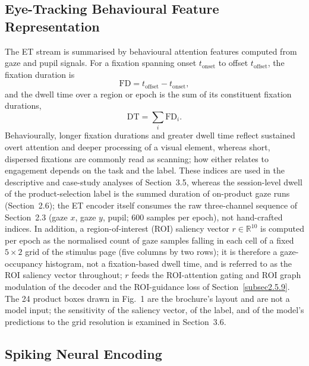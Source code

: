 \documentclass[pdflatex,sn-basic,Numbered]{sn-jnl}
\begin{document}
\subsection{Eye-Tracking Behavioural Feature Representation}\label{subsec2.5.3}

The ET stream is summarised by behavioural attention features computed from gaze and pupil signals. For a fixation spanning onset $t_{\text{onset}}$ to offset $t_{\text{offset}}$, the fixation duration is
\begin{equation}
\mathrm{FD} = t_{\text{offset}} - t_{\text{onset}}, \label{eq4}
\end{equation}
and the dwell time over a region or epoch is the sum of its constituent fixation durations,
\begin{equation}
\mathrm{DT} = \sum_i \mathrm{FD}_i. \label{eq5}
\end{equation}
Behaviourally, longer fixation durations and greater dwell time reflect sustained overt attention and deeper processing of a visual element, whereas short, dispersed fixations are commonly read as scanning; how either relates to engagement depends on the task and the label. These indices are used in the descriptive and case-study analyses of Section~3.5, whereas the session-level dwell of the product-selection label is the summed duration of on-product gaze runs (Section~2.6); the ET encoder itself consumes the raw three-channel sequence of Section~2.3 (gaze $x$, gaze $y$, pupil; 600 samples per epoch), not hand-crafted indices. In addition, a region-of-interest (ROI) saliency vector $r\in\mathbb{R}^{10}$ is computed per epoch as the normalised count of gaze samples falling in each cell of a fixed $5\times2$ grid of the stimulus page (five columns by two rows); it is therefore a gaze-occupancy histogram, not a fixation-based dwell time, and is referred to as the ROI saliency vector throughout; $r$ feeds the ROI-attention gating and ROI graph modulation of the decoder and the ROI-guidance loss of Section~\ref{subsec2.5.9}. The 24 product boxes drawn in Fig.~1 are the brochure's layout and are not a model input; the sensitivity of the saliency vector, of the label, and of the model's predictions to the grid resolution is examined in Section~3.6.

\subsection{Spiking Neural Encoding}\label{subsec2.5.4}
\end{document}
